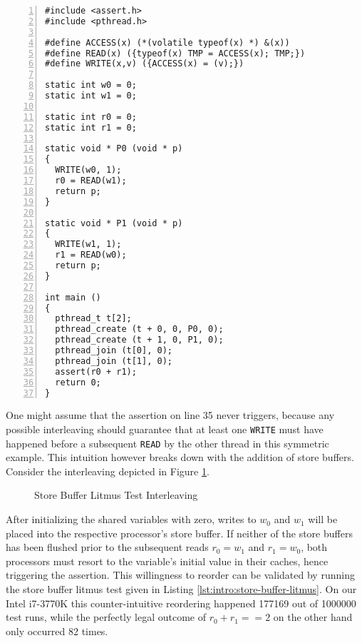 \begin{lstlisting}[style=c++, numbers=left, numberstyle=\footnotesize, numberblanklines=false, caption={Store Buffer Litmus Test}, label={lst:intro:store-buffer-litmus}]
#include <assert.h>
#include <pthread.h>

#define ACCESS(x) (*(volatile typeof(x) *) &(x))
#define READ(x) ({typeof(x) TMP = ACCESS(x); TMP;})
#define WRITE(x,v) ({ACCESS(x) = (v);})

static int w0 = 0;
static int w1 = 0;

static int r0 = 0;
static int r1 = 0;

static void * P0 (void * p)
{
  WRITE(w0, 1);
  r0 = READ(w1);
  return p;
}

static void * P1 (void * p)
{
  WRITE(w1, 1);
  r1 = READ(w0);
  return p;
}

int main ()
{
  pthread_t t[2];
  pthread_create (t + 0, 0, P0, 0);
  pthread_create (t + 1, 0, P1, 0);
  pthread_join (t[0], 0);
  pthread_join (t[1], 0);
  assert(r0 + r1);
  return 0;
}
\end{lstlisting}

One might assume that the assertion on line 35 never triggers, because any possible interleaving should guarantee that at least one \lstinline[style=c++]{WRITE} must have happened before a subsequent \lstinline[style=c++]{READ} by the other thread in this symmetric example.
This intuition however breaks down with the addition of store buffers.
Consider the interleaving depicted in Figure \ref{fig:intro:store-buffer-litmus-interleaving}.
\begin{figure}[!h]
  \centering
  
  \caption{Store Buffer Litmus Test Interleaving}
  \label{fig:intro:store-buffer-litmus-interleaving}
\end{figure}
After initializing the shared variables with zero, %
writes to $w_0$ and $w_1$ will be placed into the respective processor's store buffer.
If neither of the store buffers has been flushed prior to the subsequent reads $r_0 = w_1$ and $r_1 = w_0$, both processors must resort to the variable's initial value in their caches,
hence triggering the assertion.
This willingness to reorder can be validated by running the store buffer litmus test given in Listing \ref{lst:intro:store-buffer-litmus}.
On our Intel i7-3770K this counter-intuitive reordering happened 177169 out of 1000000 test runs, while the perfectly legal outcome of $r_0 + r_1 == 2$ on the other hand only occurred 82 times.

